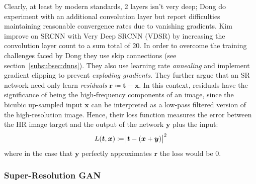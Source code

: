 Clearly, at least by modern standards, 2 layers isn't very deep; Dong \etal do experiment with an additional convolution layer but report difficulties maintaining reasonable convergence rates due to vanishing gradients.
%
Kim \etal \cite{Kim_2016} improve on SRCNN with Very Deep SRCNN (VDSR) by increasing the convolution layer count to a sum total of 20.
%
In order to overcome the training challenges faced by Dong \etal they use skip connections (see section~\ref{subsubsec:dnns}).
%
They also use learning rate \textit{annealing} and implement gradient clipping to prevent \textit{exploding gradients}.
%
They further argue that an SR network need only learn \textit{residuals} \(\bm{r} \coloneqq \bm{t} - \bm{x}\).
%
In this context, residuals have the significance of being the high-frequency components of an image, since the bicubic up-sampled input \(\bm{x}\) can be interpreted as a low-pass filtered version of the high-resolution image.
%
Hence, their loss function measures the error between the HR image target and the output of the network \(\bm{y}\) plus the input:
\begin{equation}
    L(\bm{t}, \bm{x}) \coloneqq \abs{\bm{t} - (\bm{x} + \bm{y})}^2
\end{equation}
where in the case that \(\bm{y}\) perfectly approximates \(\bm{r}\) the loss would be 0.




\subsubsection{Super-Resolution GAN}\label{subsubsec:srgan}




